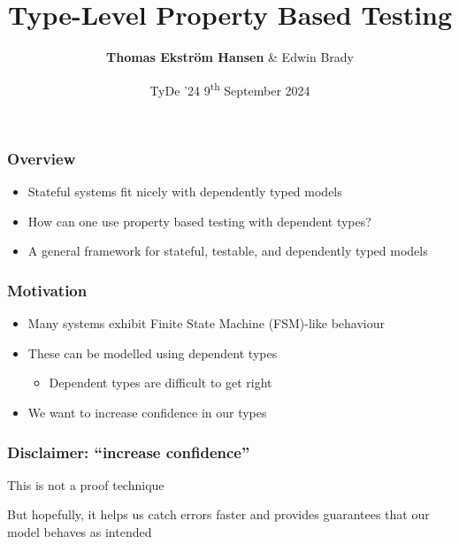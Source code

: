 \documentclass[compress,handout]{beamer}
\title{Type-Level Property Based Testing}
\author{{\bfseries Thomas Ekstr{\" o}m Hansen} \& Edwin Brady}
\date{TyDe '24 {\textemdash} 9\textsuperscript{th} September 2024}
\begin{document}
\maketitle


\begin{frame}
  \frametitle{Overview}

  \begin{itemize}
    \item<1-> Stateful systems fit nicely with dependently typed models
    \item<2-> How can one use property based testing with dependent types?
    \item<3-> A general framework for stateful, testable, and dependently typed
              models
  \end{itemize}

\end{frame}


\begin{frame}
  \frametitle{Motivation}

  \begin{itemize}
    \item<1-> Many systems exhibit Finite State Machine (FSM)-like behaviour
    \item<2-> These can be modelled using dependent types
    \begin{itemize}
      \item<2-> Dependent types are difficult to get right
    \end{itemize}
    \item<3-> We want to increase confidence in our types
  \end{itemize}

\end{frame}






\begin{frame}
  \frametitle{Disclaimer: ``increase confidence''}

  \begin{center}
    {\Large
    This is not a proof technique
    }

    {\large
    But hopefully, it helps us catch errors faster and provides guarantees that
    our model behaves as intended
    }
  \end{center}

\end{frame}
\end{document}
